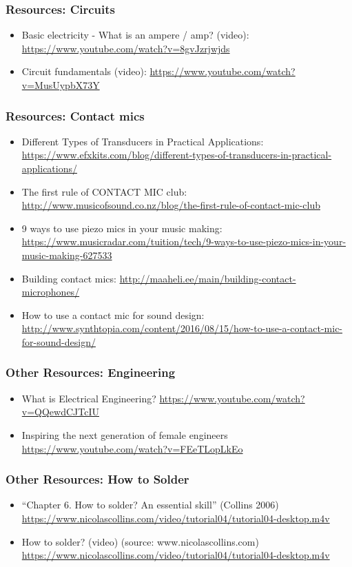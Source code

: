 \documentclass[screen, aspectratio=43]{beamer}
\begin{document}
%
\begin{frame}
  \frametitle{Resources: Circuits}
    \begin{itemize}
    \item Basic electricity - What is an ampere / amp? (video): \url{https://www.youtube.com/watch?v=8gvJzrjwjds}
    \item Circuit fundamentals (video): \url{https://www.youtube.com/watch?v=MusUypbX73Y}
    \end{itemize}    
\end{frame}
%
\begin{frame}
  \frametitle{Resources: Contact mics}
    \begin{itemize}
    	\item Different Types of Transducers in Practical Applications: \url{https://www.efxkits.com/blog/different-types-of-transducers-in-practical-applications/}
	\item The first rule of CONTACT MIC club: \url{http://www.musicofsound.co.nz/blog/the-first-rule-of-contact-mic-club}
	\item 9 ways to use piezo mics in your music making: \url{https://www.musicradar.com/tuition/tech/9-ways-to-use-piezo-mics-in-your-music-making-627533}
	\item Building contact mics: \url{http://maaheli.ee/main/building-contact-microphones/}
	\item How to use a contact mic for sound design: \url{http://www.synthtopia.com/content/2016/08/15/how-to-use-a-contact-mic-for-sound-design/}
    \end{itemize}    
\end{frame}
%
\begin{frame}
  \frametitle{Other Resources: Engineering}
    \begin{itemize}
    \item What is Electrical Engineering? \url{https://www.youtube.com/watch?v=QQewdCJTcIU}
    \item Inspiring the next generation of female engineers \url{https://www.youtube.com/watch?v=FEeTLopLkEo}
    \end{itemize}
\end{frame}
%
\begin{frame}
  \frametitle{Other Resources: How to Solder}
    \begin{itemize}
    \item ``Chapter 6. How to solder? An essential skill'' (Collins 2006)\\
    \url{https://www.nicolascollins.com/video/tutorial04/tutorial04-desktop.m4v}     
    \item How to solder? (video) (source: www.nicolascollins.com)\\
    \url{https://www.nicolascollins.com/video/tutorial04/tutorial04-desktop.m4v} 
    \end{itemize}
\end{frame}
\end{document}
